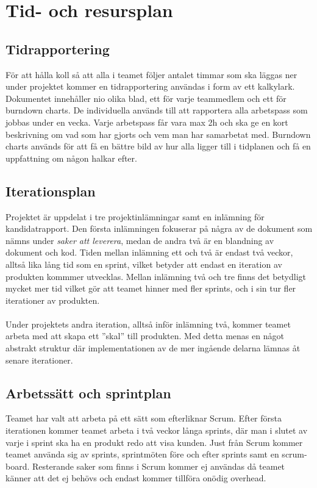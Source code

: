 \section{Tid- och resursplan}

\subsection{Tidrapportering}
För att hålla koll så att alla i teamet följer antalet timmar som ska läggas ner under
projektet kommer en tidrapportering\cite{bib-tidsrapportering} användas i form av ett 
kalkylark. Dokumentet innehåller nio olika blad, ett för varje teammedlem och ett för 
burndown charts. De individuella används till att rapportera alla arbetspass som jobbas under 
en vecka. Varje arbetspass får vara max 2h och ska ge en kort beskrivning om vad som har gjorts 
och vem man har samarbetat med. Burndown charts används för att få en bättre bild av hur alla
ligger till i tidplanen och få en uppfattning om någon halkar efter.


\subsection{Iterationsplan}
Projektet är uppdelat i tre projektinlämningar samt en inlämning för kandidatrapport. Den första inlämningen fokuserar
på några av de dokument som nämns under \textit{saker att leverera}, medan de andra två är en blandning av dokument och kod. Tiden mellan inlämning ett och två är endast två veckor, alltså lika lång tid som en sprint, vilket betyder att endast en iteration av produkten kommmer utvecklas. Mellan inlämning två och tre finns det betydligt mycket mer tid vilket gör att teamet hinner med fler sprints, och i sin tur fler iterationer av produkten.\\
\\
Under projektets andra iteration, alltså inför inlämning två, kommer teamet arbeta med att skapa ett ''skal'' till produkten. Med detta menas en något abstrakt struktur där implementationen av de mer ingående delarna lämnas åt senare iterationer.

\subsection{Arbetssätt och sprintplan}
Teamet har valt att arbeta på ett sätt som efterliknar Scrum\cite{bib-scrum}. Efter första iterationen kommer teamet arbeta i två veckor långa sprints, där man i slutet av varje i sprint ska ha en produkt redo att visa kunden. Just från Scrum kommer teamet använda sig av sprints, sprintmöten före och efter sprints samt en scrum-board. Resterande saker som finns i Scrum kommer ej användas då teamet känner att det ej behövs och endast kommer tillföra onödig overhead.

